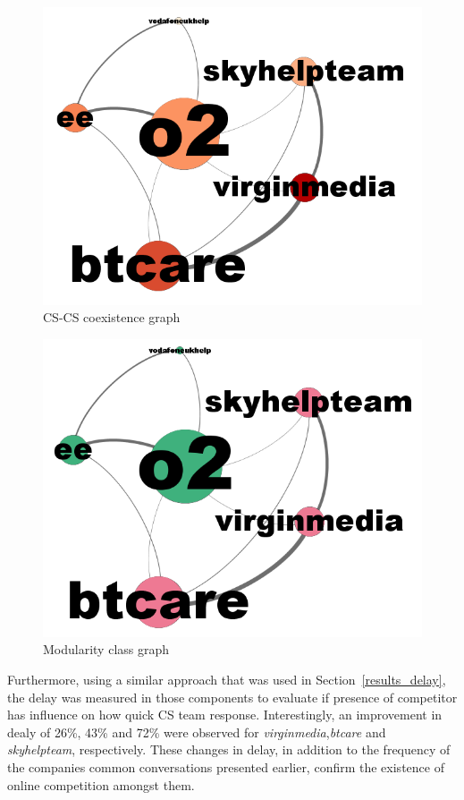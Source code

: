 \documentclass[sigconf]{acmart}
\begin{document}
{\begin{figure}[htb]
\centering
\includegraphics[width=\columnwidth]{images/coexistencegraph.png}
\caption{CS-CS coexistence graph}
\label{fig:coexistencegraph}
\end{figure}

\begin{figure}[htb]
\centering
\includegraphics[width=\columnwidth]{images/modularityclassgraph.png}
\caption{Modularity class graph}
\label{fig:modularityclassgraph}
\end{figure}

Furthermore, using a similar approach that was used in
Section~\ref{results_delay}, the delay was measured in those
components to evaluate if presence of competitor has influence on how
quick CS team response. Interestingly, an improvement in dealy of 26\%, 43\%
and 72\% were observed for {\emph{virginmedia}},{\emph{btcare}} and
{\emph{skyhelpteam}}, respectively. These changes in delay, in addition to
the frequency of the companies common conversations presented earlier, 
confirm the existence of online competition amongst them.

}
\end{document}
